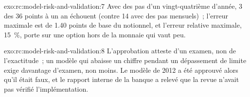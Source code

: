 \begin{solution}{exo:rc:model-risk-and-validation:7}
Avec des pas d'un vingt-quatrième d'année, 3 des 36 points à un an échouent (contre 14 avec des pas
mensuels)~; l'erreur maximale est de 1.40 points de base du notionnel, et l'erreur relative maximale, 15~\%, porte
sur une option hors de la monnaie qui vaut peu.
\end{solution}

\begin{solution}{exo:rc:model-risk-and-validation:8}
L'approbation atteste d'un examen, non de l'exactitude~; un modèle qui abaisse un chiffre pendant un dépassement de limite exige
davantage d'examen, non moins. Le modèle de 2012 a été approuvé alors qu'il était faux, et le rapport interne
de la banque a relevé que la revue n'avait pas vérifié l'implémentation.
\end{solution}


